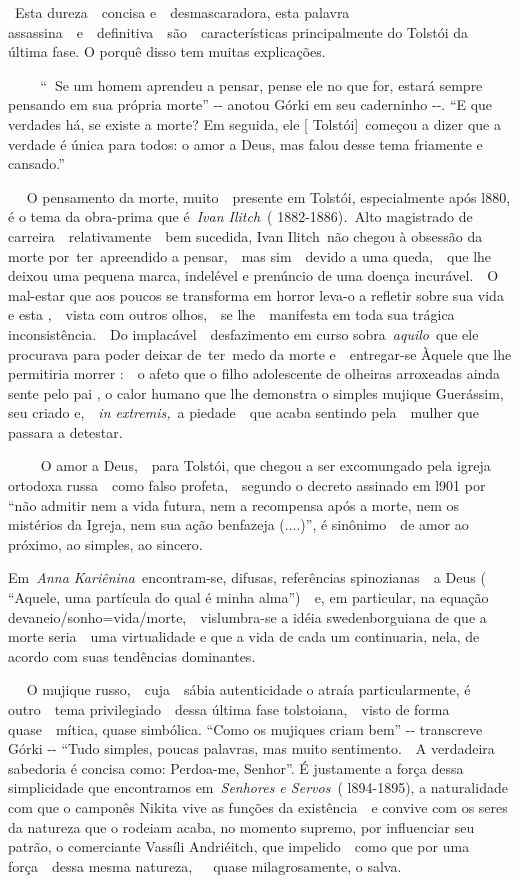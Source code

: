 ~Esta dureza~~concisa e~~desmascaradora, esta palavra
assassina~~e~~definitiva~~são~~características principalmente do Tolstói
da última fase. O porquê disso tem muitas explicações.~

\textbf{~~~~}``\textbf{~}Se um homem aprendeu a pensar, pense ele no que
for, estará sempre pensando em sua própria morte'' -\/- anotou Górki em
seu caderninho -\/-. ``E que verdades há, se existe a morte? Em seguida,
ele {[} Tolstói{]}~começou a dizer que a verdade é única para todos: o
amor a Deus, mas falou desse tema friamente e cansado.''

~~ O pensamento da morte, muito~~presente em Tolstói, especialmente após
l880, é o tema da obra-prima que é~\emph{Ivan Ilitch}~(
1882-1886)\emph{.~}Alto magistrado de carreira~~relativamente~~bem
sucedida, Ivan Ilitch\emph{~}não chegou à obsessão da morte
por~ter~apreendido a pensar,~~mas sim~~devido a uma queda,~~que lhe
deixou uma pequena marca, indelével e prenúncio de uma doença
incurável.~~O mal-estar que aos poucos se transforma em horror leva-o a
refletir sobre sua vida e esta ,~~vista com outros olhos,~~se
lhe~~manifesta em toda sua trágica inconsistência.~~Do
implacável~~desfazimento em curso sobra~\emph{aquilo}~que ele procurava
para poder deixar de~ter~medo da morte e~~entregar-se Àquele que lhe
permitiria morrer :~~o afeto que o filho adolescente de olheiras
arroxeadas ainda sente pelo pai , o calor humano que lhe demonstra o
simples mujique Guerássim, seu criado e,~~\emph{in extremis,}~a
piedade~~que acaba sentindo pela~~mulher que passara a detestar.

~~~~ O amor a Deus,~~para Tolstói, que chegou a ser excomungado pela
igreja ortodoxa russa~~como falso profeta,~~segundo o decreto assinado
em l901 por ``não admitir nem a vida futura, nem a recompensa após a
morte, nem os mistérios da Igreja, nem sua ação benfazeja (....)'', é
sinônimo~~de amor ao próximo, ao simples, ao sincero.

Em~\emph{Anna Kariênina~}encontram-se, difusas, referências
spinozianas~~a Deus ( ``Aquele, uma partícula do qual é minha
alma'')\emph{~}~e, em particular, na equação
devaneio/sonho=vida/morte,~~vislumbra-se a idéia swedenborguiana de que
a morte seria~~uma virtualidade e que a vida de cada um continuaria,
nela, de acordo com suas tendências dominantes.

~ ~O mujique russo,~~cuja~~sábia autenticidade o atraía particularmente,
é outro~~tema privilegiado~~dessa última fase tolstoiana,~~visto de
forma quase~~mítica, quase simbólica. ``Como os mujiques criam bem''
-\/- transcreve Górki -\/- ``Tudo simples, poucas palavras, mas muito
sentimento.~~A verdadeira sabedoria é concisa como: Perdoa-me, Senhor''.
É justamente a força dessa simplicidade que encontramos
em~\emph{Senhores e Servos~}( l894-1895), a naturalidade com que o
camponês Nikita vive as funções da existência~~e convive com os seres da
natureza que o rodeiam acaba, no momento supremo, por influenciar seu
patrão, o comerciante Vassíli Andriéitch, que impelido~~como que por uma
força~~dessa mesma natureza,~~~quase milagrosamente, o salva.

